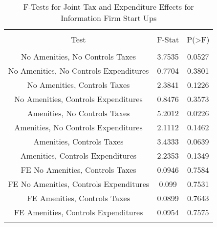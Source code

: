 
\begin{table}[!htbp] \centering 
  \caption{F-Tests for Joint Tax and Expenditure Effects for Information Firm Start Ups} 
  \label{51Ftests} 
\begin{tabular}{@{\extracolsep{5pt}} ccc} 
\\[-1.8ex]\hline 
\hline \\[-1.8ex] 
Test & F-Stat & P(\textgreater F) \\ 
\hline \\[-1.8ex] 
No Amenities, No Controls Taxes & 3.7535 & 0.0527 \\ 
No Amenities, No Controls Expenditures & 0.7704 & 0.3801 \\ 
No Amenities, Controls Taxes & 2.3841 & 0.1226 \\ 
No Amenities, Controls Expenditures & 0.8476 & 0.3573 \\ 
Amenities, No Controls Taxes & 5.2012 & 0.0226 \\ 
Amenities, No Controls Expenditures & 2.1112 & 0.1462 \\ 
Amenities, Controls Taxes & 3.4333 & 0.0639 \\ 
Amenities, Controls Expenditures & 2.2353 & 0.1349 \\ 
FE No Amenities, Controls Taxes & 0.0946 & 0.7584 \\ 
FE No Amenities, Controls Expenditures & 0.099 & 0.7531 \\ 
FE Amenities, Controls Taxes & 0.0899 & 0.7643 \\ 
FE Amenities, Controls Expenditures & 0.0954 & 0.7575 \\ 
\hline \\[-1.8ex] 
\end{tabular} 
\end{table} 
